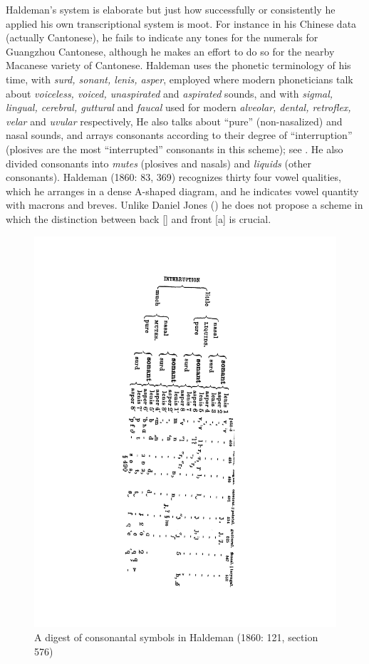 \documentclass[output=paper]{LSP/langsci}
\begin{document}
Haldeman's system is elaborate but just how successfully or consistently he applied his own transcriptional system is moot. For instance in his Chinese data (actually Cantonese), he fails to indicate any tones for the numerals for Guangzhou Cantonese, although he makes an effort to do so for  the nearby Macanese variety of Cantonese.  Haldeman uses the phonetic terminology of his time, with \textit{surd, sonant, lenis, asper}, employed where modern phoneticians talk about \textit{voiceless, voiced, unaspirated} and \textit{aspirated} sounds, and with \textit{sigmal, lingual, cerebral, guttural} and \textit{faucal} used for modern \textit{alveolar, dental, retroflex, velar} and \textit{uvular} respectively,    He also talks about ``pure'' (non-nasalized) and  nasal  sounds, and arrays consonants according to their degree of ``interruption'' (plosives are the most ``interrupted'' consonants in this scheme); see .   He also divided consonants into \textit{mutes} (plosives and nasals) and \textit{liquids} (other consonants).  Haldeman (1860: 83, 369) recognizes thirty four vowel qualities, which he arranges in a dense A-shaped diagram, and he indicates vowel quantity with macrons and breves.   Unlike Daniel Jones (\citealt{Jones1909}) he does not propose a scheme in which the distinction between back [] and front [a] is crucial.  

\begin{figure} 
\caption{A digest of consonantal symbols in Haldeman (1860: 121, section 576)} \label{haldemandigest}
\includegraphics[width=.6\textwidth,angle=92]{figures/GrantConsonants}
\end{figure}
\end{document}
